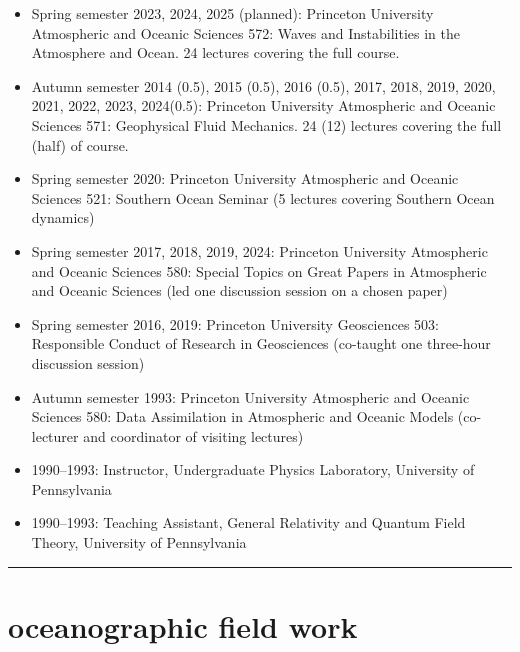 \documentclass{article}
\begin{document}
\begin{itemize}[leftmargin=*]

\item Spring semester 2023, 2024, 2025 (planned): Princeton University Atmospheric and Oceanic Sciences 572: Waves and Instabilities in the Atmosphere and Ocean. 24 lectures covering the full course.

\item Autumn semester 2014 (0.5), 2015 (0.5), 2016 (0.5), 2017, 2018, 2019, 2020, 2021, 2022, 2023, 2024(0.5): Princeton University Atmospheric and Oceanic Sciences 571: Geophysical Fluid Mechanics. 24 (12) lectures covering the full (half) of course.

\item Spring semester 2020: Princeton University Atmospheric and Oceanic Sciences 521: Southern Ocean Seminar (5 lectures covering Southern Ocean dynamics)

\item Spring semester 2017, 2018, 2019, 2024: Princeton University Atmospheric and Oceanic Sciences 580: Special Topics on Great Papers in Atmospheric and Oceanic Sciences (led one discussion session on a chosen paper)

\item Spring semester 2016, 2019: Princeton University Geosciences 503: Responsible Conduct of Research in Geosciences (co-taught one three-hour discussion session)

\item Autumn semester 1993: Princeton University Atmospheric and Oceanic Sciences 580: Data Assimilation in Atmospheric and Oceanic Models (co-lecturer and coordinator of visiting lectures)

\item 1990--1993:  Instructor, Undergraduate Physics Laboratory, University of Pennsylvania 

\item 1990--1993:  Teaching Assistant,  General Relativity and Quantum Field Theory, University of Pennsylvania 

\end{itemize}

\noindent\rule{\textwidth}{1pt}
\vspace{-1cm}
\section*{\sc \color{Maroon}  oceanographic field work}
\vspace{-.25cm}
\end{document}

